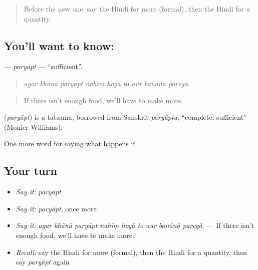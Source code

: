 \begin{quote}
Before the new one: say the Hindi for more (formal), then the Hindi for a quantity.
\end{quote}

\subsection*{You'll want to know: }
\textbf{} — \emph{paryāpt} — \textquotedblleft{}sufficient\textquotedblright{}.

\begin{quote}
        
\end{quote}

\begin{quote}
\emph{agar khānā paryāpt nahīṃ hogā to aur banānā paṛegā.}
\end{quote}

\begin{quote}
If there isn't enough food, we'll have to make more.
\end{quote}

\begin{cousinweb}
\textbf{} (\emph{paryāpt}) is a tatsama, borrowed from Sanskrit \emph{paryāpta}, \textquotedblleft{}complete; sufficient\textquotedblright{} (Monier-Williams).
\end{cousinweb}

\begin{grammarlens}[title={What you've built}]
One more word for saying what happens if.
\end{grammarlens}

\subsection*{Your turn}
\begin{itemize}
\raggedright
  \item \emph{Say it:} \emph{paryāpt}
  \item \emph{Say it:} \emph{paryāpt}, once more
  \item \emph{Say it:} \emph{agar khānā paryāpt nahīṃ hogā to aur banānā paṛegā.} — If there isn't enough food, we'll have to make more.
  \item \emph{Recall:} say the Hindi for more (formal), then the Hindi for a quantity, then say \emph{paryāpt} again
\end{itemize}

